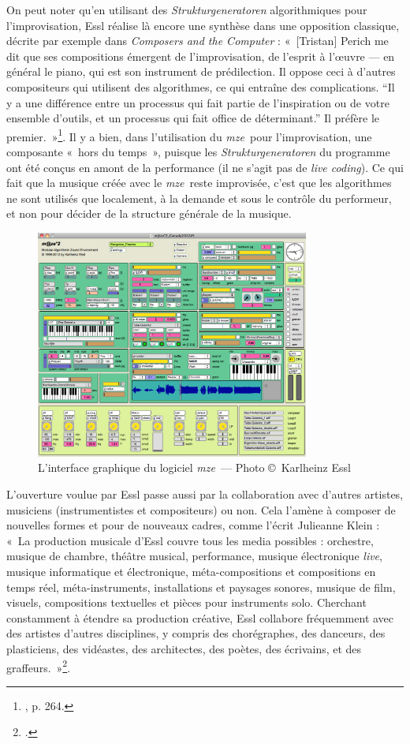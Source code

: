 \documentclass[a4paper,12pt]{article}
\newcommand{\guill}[1]{«~#1~»}
\newcommand{\guilldeux}[1]{“#1”}
\newcommand{\maze}[0]{\emph{m\symbol{64}ze\textdegree2}}
\begin{document}
On peut noter qu'en utilisant des \emph{Strukturgeneratoren} algorithmiques pour l'improvisation, Essl réalise là encore une synthèse dans une opposition classique, décrite par exemple dans \emph{Composers and the Computer} : \guill{[Tristan] Perich me dit que ses compositions émergent de l'improvisation, de l'esprit à l'œuvre --- en général le piano, qui est son instrument de prédilection. Il oppose ceci à d'autres compositeurs qui utilisent des algorithmes, ce qui entraîne des complications. \guilldeux{Il y a une différence entre un processus qui fait partie de l'inspiration ou de votre ensemble d'outils, et un processus qui fait office de déterminant.} Il préfère le premier.}\footnote{\cite{appleton1986composers}, p. 264.}. Il y a bien, dans l'utilisation du \maze~pour l'improvisation, une composante \guill{hors du temps}, puisque les \emph{Strukturgeneratoren} du programme ont été conçus en amont de la performance (il ne s'agit pas de \emph{live coding}). Ce qui fait que la musique créée avec le \maze~reste improvisée, c'est que les algorithmes ne sont utilisés que localement, à la demande et sous le contrôle du performeur, et non pour décider de la structure générale de la musique.

\begin{figure}[h!]
\begin{center}
\includegraphics[width=9cm]{images/maze.png}
\caption{\footnotesize L'interface graphique du logiciel \maze~--- Photo \copyright~Karlheinz Essl}
\label{mazephoto}
\end{center}
\end{figure}

L'ouverture voulue par Essl passe aussi par la collaboration avec d'autres artistes, musiciens (instrumentistes et compositeurs) ou non. Cela l'amène à composer de nouvelles formes et pour de nouveaux cadres, comme l'écrit Julieanne Klein : \guill{La production musicale d'Essl couvre tous les media possibles : orchestre, musique de chambre, théâtre musical, performance, musique électronique \emph{live}, musique informatique et électronique, méta-compositions et compositions en temps réel, méta-instruments, installations et paysages sonores, musique de film, visuels, compositions textuelles et pièces pour instruments solo. Cherchant constamment à étendre sa production créative, Essl collabore fréquemment avec des artistes d'autres disciplines, y compris des chorégraphes, des danceurs, des plasticiens, des vidéastes, des architectes, des poètes, des écrivains, et des graffeurs.}\footnote{\cite{jklein}.}.
\end{document}
